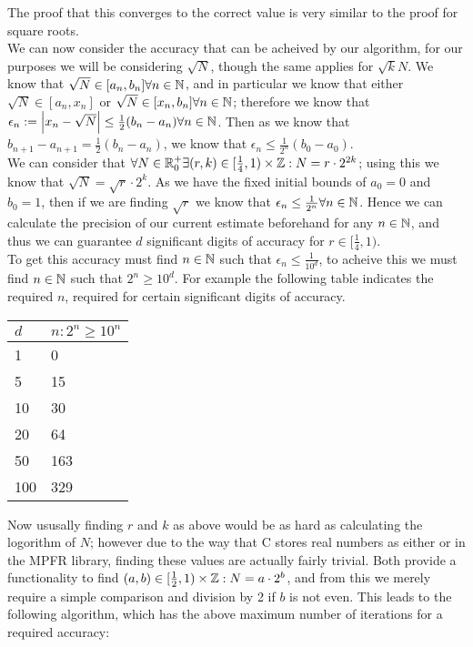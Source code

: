 The proof that this converges to the correct value is very similar to the proof for square roots.\\

We can now consider the accuracy that can be acheived by our algorithm, for our purposes we will be considering \(\sqrt{N}\), though the same applies for \(\sqrt{k}{N}\). We know that \(\sqrt{N} \in [a_n, b_n] \forall n \in \mathbb{N}\), and in particular we know that either \(\sqrt{N} \in [a_n, x_n]\) or \(\sqrt{N} \in [x_n, b_n] \forall n \in \mathbb{N}\); therefore we know that \(\epsilon_n := \left|x_n - \sqrt{N}\right| \le \tfrac{1}{2}(b_n - a_n) \forall n \in \mathbb{N}\). Then as we know that \(b_{n+1} - a_{n+1} = \tfrac{1}{2}(b_n - a_n)\), we know that \(\epsilon_n \le \tfrac{1}{2^n}(b_0 - a_0)\).\\

We can consider that \(\forall N \in \mathbb{R}^+_0 \exists (r,k) \in [\frac{1}{4},1)\times\mathbb{Z} : N = r \cdot 2^{2k}\); using this we know that \(\sqrt{N} = \sqrt{r} \cdot 2^k\). As we have the fixed initial bounds of \(a_0 = 0\) and \(b_0 = 1\), then if we are finding \(\sqrt{r}\) we know that \(\epsilon_n \le \tfrac{1}{2^n} \forall n \in \mathbb{N}\). Hence we can calculate the precision of our current estimate beforehand for any \(n \in \mathbb{N}\), and thus we can guarantee \(d\) significant digits of accuracy for \(r \in [\frac{1}{4}, 1)\).\\

To get this accuracy must find \(n \in \mathbb{N}\) such that \(\epsilon_n \le \tfrac{1}{10^d}\), to acheive this we must find \(n \in \mathbb{N}\) such that \(2^n \ge 10^d\). For example the following table indicates the required \(n\), required for certain significant digits of accuracy.

\begin{center}
	\begin{tabular}{|p{3cm}|p{3cm}|}
	\hline
	\(d\) & \(n : 2^n \ge 10^n\)\\
	\hline
	1 & 0\\\hline
	5 & 15\\\hline
	10 & 30\\\hline
	20 & 64\\\hline
	50 & 163\\\hline
	100 & 329\\\hline
	\end{tabular}
\end{center}

Now ususally finding \(r\) and \(k\) as above would be as hard as calculating the logorithm of \(N\); however due to the way that C stores real numbers as either  or in the MPFR library, finding these values are actually fairly trivial. Both provide a functionality to find \((a, b) \in [\frac{1}{2}, 1)\times \mathbb{Z} : N = a\cdot2^b\), and from this we merely require a simple comparison and division by 2 if \(b\) is not even. This leads to the following algorithm, which has the above maximum number of iterations for a required accuracy:


